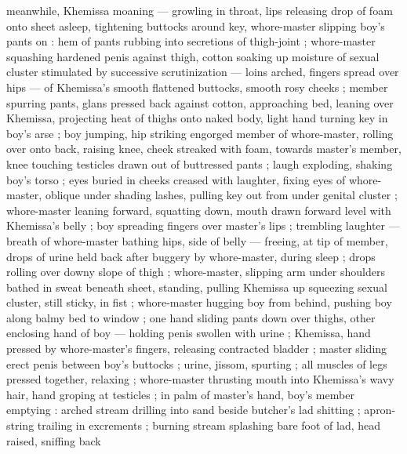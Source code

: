 meanwhile, Khemissa moaning --- growling in throat, lips releasing drop of foam onto sheet {\dashcom} asleep, tightening buttocks around key, whore-master slipping boy's pants on : hem of pants rubbing into secretions of thigh-joint ; whore-master squashing hardened penis against thigh, cotton soaking up moisture of sexual cluster stimulated by successive scrutinization --- loins arched, fingers spread over hips --- of Khemissa's smooth flattened buttocks, smooth rosy cheeks ; member spurring pants, glans pressed back against cotton, approaching bed, leaning over Khemissa, projecting heat of thighs onto naked body, light hand turning key in boy's arse ; boy jumping, hip striking engorged member of whore-master, rolling over onto back, raising knee, cheek streaked with foam, towards master's member, knee touching testicles drawn out of buttressed pants ; laugh exploding, shaking boy's torso ; eyes buried in cheeks creased with laughter, fixing eyes of whore-master, oblique under shading lashes, pulling key out from under genital cluster ; whore-master leaning forward, squatting down, mouth drawn forward level with Khemissa's belly ; boy spreading fingers over master's lips ; trembling laughter --- breath of whore-master bathing hips, side of belly --- freeing, at tip of member, drops of urine held back after buggery by whore-master, during sleep ; drops rolling over downy slope of thigh ; whore-master, slipping arm under shoulders bathed in sweat beneath sheet, standing, pulling Khemissa up squeezing sexual cluster, still sticky, in fist ; whore-master hugging boy from behind, pushing boy along balmy bed to window ; one hand sliding pants down over thighs, other enclosing hand of boy --- holding penis swollen with urine ; Khemissa, hand pressed by whore-master's fingers, releasing contracted bladder ; master sliding erect penis between boy's buttocks ; urine, jissom, spurting ; all muscles of legs pressed together, relaxing ; whore-master thrusting mouth into Khemissa's wavy hair, hand groping at testicles ; in palm of master's hand, boy's member emptying : arched stream drilling into sand beside butcher's lad shitting ; apron-string trailing in excrements ; burning stream splashing bare foot of lad, head raised, sniffing back 

